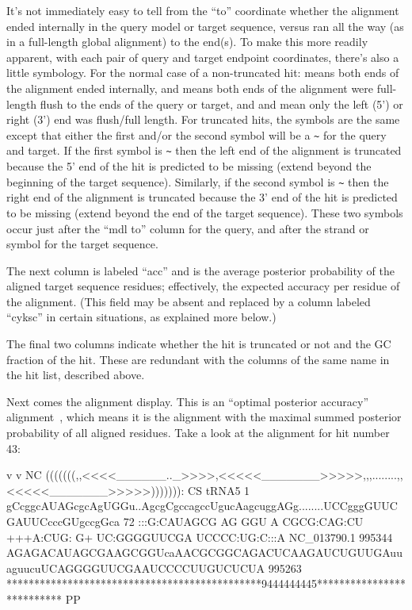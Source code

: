 It's not immediately easy to tell from the ``to'' coordinate whether
the alignment ended internally in the query model or target sequence,
versus ran all the way (as in a full-length global alignment) to the
end(s). To make this more readily apparent, with each pair of query
and target endpoint coordinates, there's also a little symbology. For
the normal case of a non-truncated hit:  means both ends of
the alignment ended internally, and \otext{[]} means both ends of the
alignment were full-length flush to the ends of the query or target,
and \otext{[.}  and \otext{.]} mean only the left (5') or right (3') end
was flush/full length. For truncated hits, the symbols are the same
except that either the first and/or the second symbol will be a
\verb+~+ for the query and target. If the first symbol is \verb+~+
then the left end of the alignment is truncated because the 5' end of
the hit is predicted to be missing (extend beyond the beginning of the
target sequence). Similarly, if the second symbol is \verb+~+ then the
right end of the alignment is truncated because the 3' end of the hit
is predicted to be missing (extend beyond the end of the target
sequence). These two symbols occur just after the ``mdl to'' column for
the query, and after the strand \otext{+} or \otext{-} symbol for the
target sequence.

The next column is labeled ``acc'' and is the average posterior
probability of the aligned target sequence residues; effectively, the
expected accuracy per residue of the alignment. (This field may be
absent and replaced by a column labeled ``cyksc'' in certain
situations, as explained more below.)

The final two columns indicate whether the hit is truncated or not and
the GC fraction of the hit. These are redundant with the columns of
the same name in the hit list, described above.

Next comes the alignment display. This is an ``optimal
posterior accuracy'' alignment~\citep{Holmes98}, which means it is the
alignment with the maximal summed posterior probability of all
aligned residues. Take a look at the alignment for hit number 43:

\begin{sreoutput}
                                 v         v                                                            NC
                     (((((((,,<<<<______.._>>>>,<<<<<_______>>>>>,,,........,,<<<<<_______>>>>>))))))): CS
        tRNA5      1 gCcggcAUAGcgcAgUGGu..AgcgCgccagccUgucAagcuggAGg........UCCgggGUUCGAUUCcccGUgccgGca 72    
                     :::G:CAUAGCG AG GGU  A CGCG:CAG:CU +++A:CUG: G+        UC:GGGGUUCGA UCCCC:UG:C:::A
  NC_013790.1 995344 AGAGACAUAGCGAAGCGGUcaAACGCGGCAGACUCAAGAUCUGUUGAuuaguucuUCAGGGGUUCGAAUCCCCUUGUCUCUA 995263
                     **********************************************9444444445************************** PP
\end{sreoutput}

